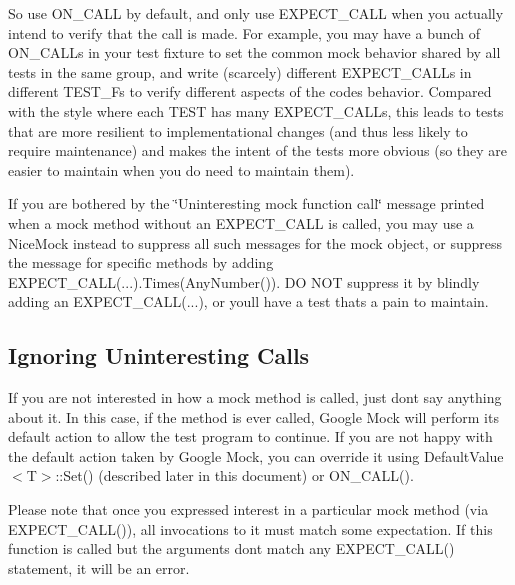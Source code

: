 So use {\ttfamily O\+N\+\_\+\+C\+A\+LL} by default, and only use {\ttfamily E\+X\+P\+E\+C\+T\+\_\+\+C\+A\+LL} when you actually intend to verify that the call is made. For example, you may have a bunch of {\ttfamily O\+N\+\_\+\+C\+A\+LL}s in your test fixture to set the common mock behavior shared by all tests in the same group, and write (scarcely) different {\ttfamily E\+X\+P\+E\+C\+T\+\_\+\+C\+A\+LL}s in different {\ttfamily T\+E\+S\+T\+\_\+F}s to verify different aspects of the code\textquotesingle{}s behavior. Compared with the style where each {\ttfamily T\+E\+ST} has many {\ttfamily E\+X\+P\+E\+C\+T\+\_\+\+C\+A\+LL}s, this leads to tests that are more resilient to implementational changes (and thus less likely to require maintenance) and makes the intent of the tests more obvious (so they are easier to maintain when you do need to maintain them).

If you are bothered by the \char`\"{}\+Uninteresting mock function call\char`\"{} message printed when a mock method without an {\ttfamily E\+X\+P\+E\+C\+T\+\_\+\+C\+A\+LL} is called, you may use a {\ttfamily Nice\+Mock} instead to suppress all such messages for the mock object, or suppress the message for specific methods by adding {\ttfamily E\+X\+P\+E\+C\+T\+\_\+\+C\+A\+LL(...).Times(\+Any\+Number())}. DO N\+OT suppress it by blindly adding an {\ttfamily E\+X\+P\+E\+C\+T\+\_\+\+C\+A\+LL(...)}, or you\textquotesingle{}ll have a test that\textquotesingle{}s a pain to maintain.

\subsection*{Ignoring Uninteresting Calls}

If you are not interested in how a mock method is called, just don\textquotesingle{}t say anything about it. In this case, if the method is ever called, Google Mock will perform its default action to allow the test program to continue. If you are not happy with the default action taken by Google Mock, you can override it using {\ttfamily Default\+Value$<$T$>$\+::\+Set()} (described later in this document) or {\ttfamily O\+N\+\_\+\+C\+A\+L\+L()}.

Please note that once you expressed interest in a particular mock method (via {\ttfamily E\+X\+P\+E\+C\+T\+\_\+\+C\+A\+L\+L()}), all invocations to it must match some expectation. If this function is called but the arguments don\textquotesingle{}t match any {\ttfamily E\+X\+P\+E\+C\+T\+\_\+\+C\+A\+L\+L()} statement, it will be an error.

